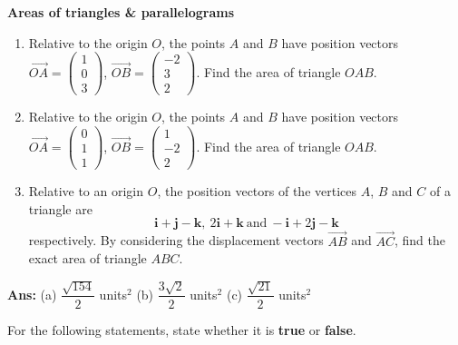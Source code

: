 \documentclass[a4paper,11pt,oneside]{book}
\providecommand{\vv}[1]{\overrightarrow{#1}}\providecommand{\cvv}[3]{\begin{pmatrix}#1\\#2\\#3\end{pmatrix}}
\newcounter{wq}[section]
\newcommand{\Q}[1]{\par\needspace{5\baselineskip}\medskip\stepcounter{wq}\noindent\textbf{\thewq}\quad #1\par}
\begin{document}
\Q{\textbf{Areas of triangles \& parallelograms}\par\smallskip \begin{enumerate}[label=(\alph*)]
\item Relative to the origin $O$, the points $A$ and $B$ have position vectors $\vv{OA}=\cvv{1}{0}{3}$, $\vv{OB}=\cvv{-2}{3}{2}$. Find the area of triangle $OAB$.
\item Relative to the origin $O$, the points $A$ and $B$ have position vectors $\vv{OA}=\cvv{0}{1}{1}$, $\vv{OB}=\cvv{1}{-2}{2}$. Find the area of triangle $OAB$.
\item Relative to an origin $O$, the position vectors of the vertices $A$, $B$ and $C$ of a triangle are
\[
\mathbf i+\mathbf j-\mathbf k,\ 2\mathbf i+\mathbf k\ \text{and}\ -\mathbf i+2\mathbf j-\mathbf k
\]
respectively. By considering the displacement vectors $\vv{AB}$ and $\vv{AC}$, find the exact area of triangle $ABC$.
\end{enumerate}}
\par\smallskip \textbf{Ans:} \quad (a) $\dfrac{\sqrt{154}}{2}$ units$^2$ \quad (b) $\dfrac{3\sqrt2}{2}$ units$^2$ \quad (c) $\dfrac{\sqrt{21}}{2}$ units$^2$
\endgroup
\clearpage
\Q{For the following statements, state whether it is \textbf{true} or \textbf{false}.}
\end{document}
